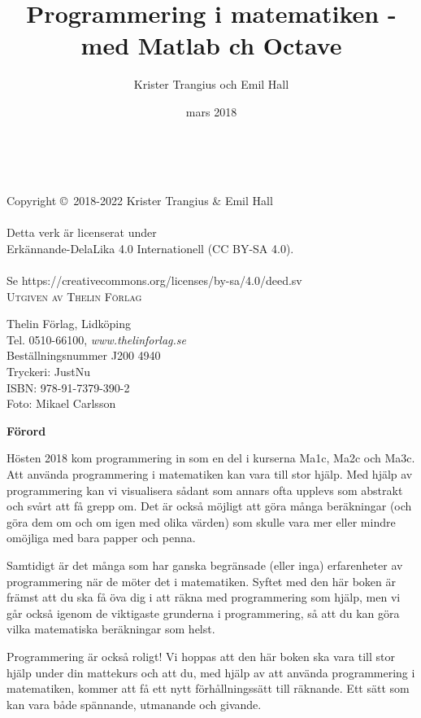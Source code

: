 \documentclass[14pt]{extbook}
\title{Programmering i matematiken - med Matlab ch Octave}
\author{Krister Trangius och Emil Hall}
\date{mars 2018}
\begin{document}
\newpage
~\vfill
\thispagestyle{empty}

\noindent Copyright \copyright\ 2018-2022 Krister Trangius \&  Emil Hall\\ %
\\
Detta verk är licenserat under\\
Erkännande-DelaLika 4.0 Internationell (CC BY-SA 4.0).\\
\\
Se https://creativecommons.org/licenses/by-sa/4.0/deed.sv\\

\noindent \textsc{Utgiven av Thelin Förlag} %

Thelin Förlag, Lidköping\\
Tel. 0510-66100, \emph{www.thelinforlag.se}\\
Beställningsnummer J200 4940\\
Tryckeri: JustNu\\
ISBN: 978-91-7379-390-2\\
Foto: Mikael Carlsson

\newpage

\newpage
\thispagestyle{empty}
{\Large{\textbf{Förord}}}

Hösten 2018 kom programmering in som en del i kurserna Ma1c, Ma2c och Ma3c. Att använda programmering i matematiken kan vara till stor hjälp. Med hjälp av programmering kan vi visualisera sådant som annars ofta upplevs som abstrakt och svårt att få grepp om. Det är också möjligt att göra många beräkningar (och göra dem om och om igen med olika värden) som skulle vara mer eller mindre omöjliga med bara papper och penna.

Samtidigt är det många som har ganska begränsade (eller inga) erfarenheter av programmering när de möter det i matematiken. Syftet med den här boken är främst att du ska få öva dig i att räkna med programmering som hjälp, men vi går också igenom de viktigaste grunderna i programmering, så att du kan göra  vilka matematiska beräkningar som helst.

Programmering är också roligt! Vi hoppas att den här boken ska vara till stor hjälp under din mattekurs och att du, med hjälp av att använda programmering i matematiken, kommer att få ett nytt förhållningssätt till räknande. Ett sätt som kan vara både spännande, utmanande och givande. 
\end{document}

